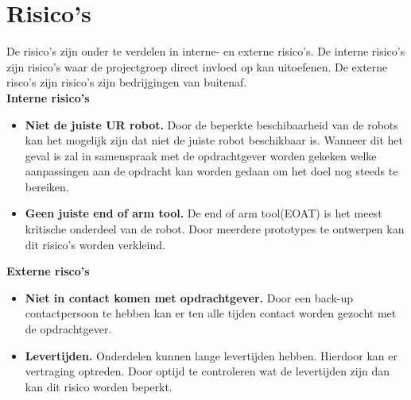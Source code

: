 
\section{Risico's}

De risico's zijn onder te verdelen in interne- en externe risico's. De interne risico's zijn risico's waar de projectgroep direct invloed op kan uitoefenen. De externe risco's zijn risico's zijn bedrijgingen van buitenaf. \\[0.5cm]

\textbf{Interne risico's}
\begin{itemize}
	\item \textbf{Niet de juiste UR robot.} Door de beperkte beschibaarheid van de robots kan het mogelijk zijn dat niet de juiste robot beschikbaar is. Wanneer dit het geval is zal in samenspraak met de opdrachtgever worden gekeken welke aanpassingen aan de opdracht kan worden gedaan om het doel nog steeds te bereiken.
	\item \textbf{Geen juiste end of arm tool.} De end of arm tool(EOAT) is het meest kritische onderdeel van de robot. Door meerdere prototypes te ontwerpen kan dit risico's worden verkleind. 
\end{itemize}

\textbf{Externe risco's}
\begin{itemize}
	\item \textbf{Niet in contact komen met opdrachtgever.} Door een back-up contactpersoon te hebben kan er ten alle tijden contact worden gezocht met de opdrachtgever.

	\item \textbf{Levertijden.} Onderdelen kunnen lange levertijden hebben. Hierdoor kan er vertraging optreden. Door optijd te controleren wat de levertijden zijn dan kan dit risico worden beperkt.
\end{itemize}
\newpage

